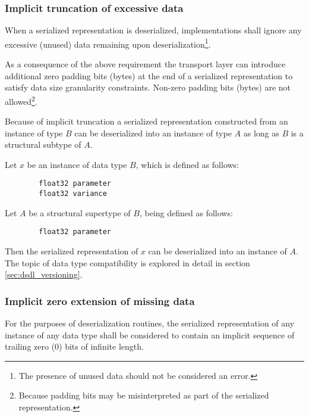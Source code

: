 \subsubsection{Implicit truncation of excessive data}

When a serialized representation is deserialized, implementations shall ignore
any excessive (unused) data remaining upon deserialization\footnote{%
    The presence of unused data should not be considered an error.
}.

As a consequence of the above requirement the transport layer can introduce
additional zero padding bits (bytes) at the end of a serialized representation
to satisfy data size granularity constraints.
Non-zero padding bits (bytes) are not allowed\footnote{%
    Because padding bits may be misinterpreted as part of the serialized representation.
}.

\begin{remark}
    Because of implicit truncation a serialized representation constructed from an instance of type $B$ can be
    deserialized into an instance of type $A$ as long as $B$ is a structural subtype of $A$.

    Let $x$ be an instance of data type $B$, which is defined as follows:

    \begin{verbatim}
        float32 parameter
        float32 variance
    \end{verbatim}

    Let $A$ be a structural supertype of $B$, being defined as follows:

    \begin{verbatim}
        float32 parameter
    \end{verbatim}

    Then the serialized representation of $x$ can be deserialized into an instance of $A$.
    The topic of data type compatibility is explored in detail in section \ref{sec:dsdl_versioning}.
\end{remark}

\subsubsection{Implicit zero extension of missing data}

For the purposes of deserialization routines,
the serialized representation of any instance of any data type shall be considered to contain an implicit
sequence of trailing zero (0) bits of infinite length.

